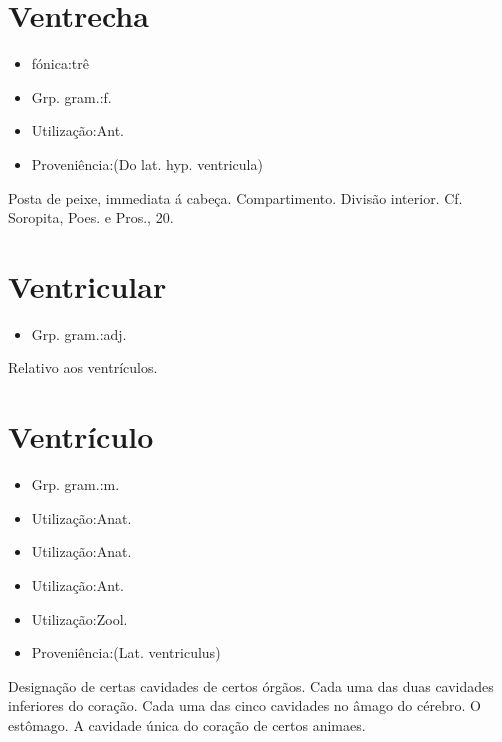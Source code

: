 \documentclass{article}
\begin{document}
\section{Ventrecha}
\begin{itemize}
\item {fónica:trê}
\end{itemize}
\begin{itemize}
\item {Grp. gram.:f.}
\end{itemize}
\begin{itemize}
\item {Utilização:Ant.}
\end{itemize}
\begin{itemize}
\item {Proveniência:(Do lat. hyp. \textunderscore ventricula\textunderscore )}
\end{itemize}
Posta de peixe, immediata á cabeça.
Compartimento.
Divisão interior. Cf. Soropita, \textunderscore Poes. e Pros.\textunderscore , 20.
\section{Ventricular}
\begin{itemize}
\item {Grp. gram.:adj.}
\end{itemize}
Relativo aos ventrículos.
\section{Ventrículo}
\begin{itemize}
\item {Grp. gram.:m.}
\end{itemize}
\begin{itemize}
\item {Utilização:Anat.}
\end{itemize}
\begin{itemize}
\item {Utilização:Anat.}
\end{itemize}
\begin{itemize}
\item {Utilização:Ant.}
\end{itemize}
\begin{itemize}
\item {Utilização:Zool.}
\end{itemize}
\begin{itemize}
\item {Proveniência:(Lat. \textunderscore ventriculus\textunderscore )}
\end{itemize}
Designação de certas cavidades de certos órgãos.
Cada uma das duas cavidades inferiores do coração.
Cada uma das cinco cavidades no âmago do cérebro.
O estômago.
A cavidade única do coração de certos animaes.
\end{document}
